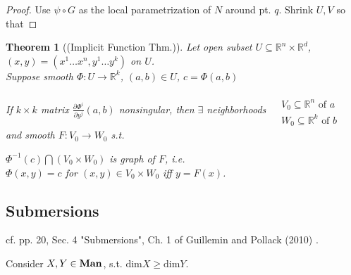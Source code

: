 \documentclass[10pt]{amsart}
\newtheorem{theorem}{Theorem}
\begin{document}
\begin{multicols*}{2}
\begin{proof}
Use $\psi \circ G$ as the local parametrization of $N$ around pt. $q$.  Shrink $U,V$ so that 


\end{proof}






\begin{theorem}[(Implicit Function Thm.)]
  Let open subset $U\subseteq \mathbb{R}^n \times \mathbb{R}^d$, $(x,y) = (x^1 \dots x^n, y^1 \dots y^k) $ on $U$.  \\
  Suppose smooth $\Phi:U\to \mathbb{R}^k$, $(a,b) \in U$, $c=\Phi(a,b)$

  If $k\times k$ matrix $\frac{ \partial \Phi^i}{ \partial y^j}(a,b)$ nonsingular, then $\exists $ neighborhoods $\begin{aligned} & \quad \\
    & V_0 \subseteq \mathbb{R}^n \text{ of $a$ } \\
    & W_0 \subseteq \mathbb{R}^k \text{ of $b$ } \end{aligned}$ and smooth $F:V_0 \to W_0$ s.t.

  $\Phi^{-1}(c) \bigcap (V_0\times W_0)$ is graph of $F$, i.e. \\
  $\Phi(x,y) =c$ for $(x,y) \in V_0\times W_0$ iff $y=F(x)$.  
  \end{theorem}



\subsection{Submersions} 
cf. pp. 20, Sec. 4 "Submersions", Ch. 1 of Guillemin and Pollack (2010) \cite{VGuilleminAPollack2010}.  

Consider $X,Y\in \text{\textbf{Man}}$, s.t. $\text{dim}X \geq \text{dim}Y$.  


\end{multicols*}
\end{document}
